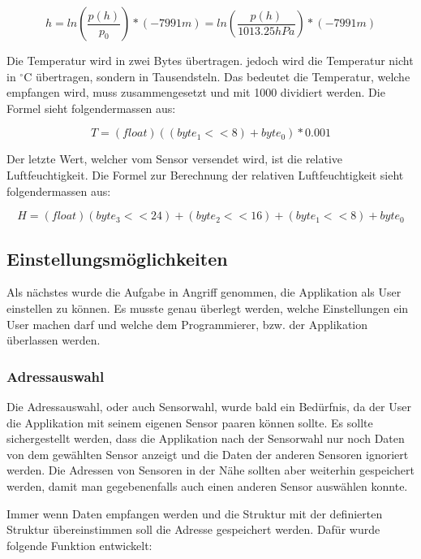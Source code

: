 \begin{equation}
	h = ln(\frac{p(h)}{p_0}) * (-7991 m) = ln(\frac{p(h)}{1013.25 hPa}) * (-7991 m)
\end{equation}

Die Temperatur wird in zwei Bytes übertragen. jedoch wird die Temperatur nicht in $^\circ$C übertragen, sondern in Tausendsteln. Das bedeutet die Temperatur, welche empfangen wird, muss zusammengesetzt und mit 1000 dividiert werden. Die Formel sieht folgendermassen aus:

\begin{equation}
	T = (float)((byte_1 << 8) + byte_0) * 0.001
\end{equation}

Der letzte Wert, welcher vom Sensor versendet wird, ist die relative Luftfeuchtigkeit. Die Formel zur Berechnung der relativen Luftfeuchtigkeit sieht folgendermassen aus:

\begin{equation}
	H = (float)(byte_3 << 24) + (byte_2 << 16) + (byte_1 << 8) + byte_0
\end{equation}


\subsection{Einstellungsmöglichkeiten}

Als nächstes wurde die Aufgabe in Angriff genommen, die Applikation als User einstellen zu können. Es musste genau überlegt werden, welche Einstellungen ein User machen darf und welche dem Programmierer, bzw. der Applikation überlassen werden.


\subsubsection{Adressauswahl}

Die Adressauswahl, oder auch Sensorwahl, wurde bald ein Bedürfnis, da der User die Applikation mit seinem eigenen Sensor paaren können sollte. Es sollte sichergestellt werden, dass die Applikation nach der Sensorwahl nur noch Daten von dem gewählten Sensor anzeigt und die Daten der anderen Sensoren ignoriert werden. Die Adressen von Sensoren in der Nähe sollten aber weiterhin gespeichert werden, damit man gegebenenfalls auch einen anderen Sensor auswählen konnte.

Immer wenn Daten empfangen werden und die Struktur mit der definierten Struktur übereinstimmen soll die Adresse gespeichert werden. Dafür wurde folgende Funktion entwickelt:


